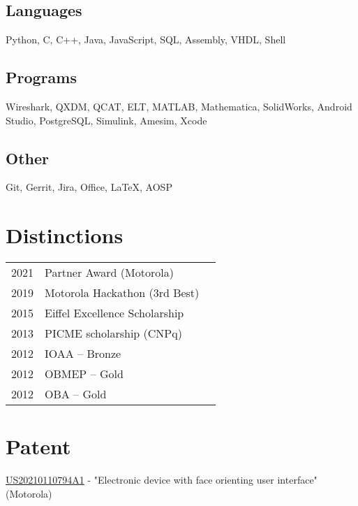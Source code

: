 \documentclass[]{deedy-resume}
\begin{document}
\begin{minipage}[t]{0.33\textwidth}
\subsection{Languages}
Python, C, C++, Java, JavaScript, 
SQL, Assembly, VHDL, Shell 
\sectionsep

\subsection{Programs}
Wireshark, QXDM, QCAT, ELT, MATLAB, 
Mathematica, SolidWorks, Android Studio,
PostgreSQL, Simulink, Amesim, Xcode
\sectionsep

\subsection{Other}
Git, Gerrit, Jira, Office, LaTeX, AOSP


\section{Distinctions} 
\begin{tabular}{rll}
2021         & Partner Award (Motorola)\\
2019         & Motorola Hackathon (3rd Best)\\
2015	     & Eiffel Excellence Scholarship\\
2013         & PICME scholarship (CNPq)\\
2012	     & IOAA -- Bronze\\
2012	     & OBMEP -- Gold\\
2012	     & OBA -- Gold \\
\end{tabular}
\sectionsep

\section{Patent}
\href{https://patents.google.com/patent/US20210110794A1/}{US20210110794A1} - "Electronic device with face orienting user interface" (Motorola)
\sectionsep

%
%

\end{minipage} 
\end{document}
